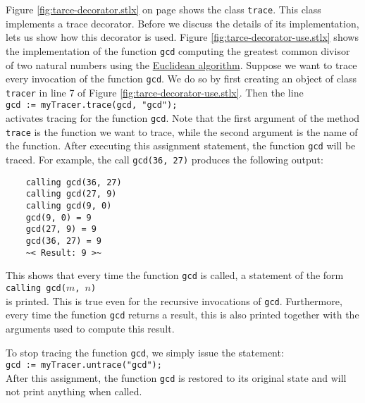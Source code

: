 Figure \ref{fig:tarce-decorator.stlx} on page \pageref{fig:tarce-decorator.stlx} shows the class
\texttt{trace}.  This class implements a trace decorator.  Before we discuss the details of its
implementation, lets us show how this decorator is used.  Figure \ref{fig:tarce-decorator-use.stlx}
shows the implementation of the function \texttt{gcd} computing the greatest common divisor of two
natural numbers using the \href{http://en.wikipedia.org/wiki/Euclidean_algorithm}{Euclidean algorithm}.
Suppose we want to trace every invocation of the function \texttt{gcd}.  We do so by first creating
an object of class \texttt{tracer} in line 7 of Figure \ref{fig:tarce-decorator-use.stlx}.  Then the line
\\[0.2cm]
\hspace*{1.3cm}
\texttt{gcd := myTracer.trace(gcd, "gcd");}
\\[0.2cm]
activates tracing for the function \texttt{gcd}.  Note that the first argument of the method
\texttt{trace} is the function we want to trace, while the second argument is the name of the function.
After executing this assignment statement, the function \texttt{gcd} will be traced.
For example, the call \texttt{gcd(36, 27)} produces the following output:
\begin{verbatim}
    calling gcd(36, 27)
    calling gcd(27, 9)
    calling gcd(9, 0)
    gcd(9, 0) = 9
    gcd(27, 9) = 9
    gcd(36, 27) = 9
    ~< Result: 9 >~
\end{verbatim}
This shows that every time the function \texttt{gcd} is called, a statement of the form
\\[0.2cm]
\hspace*{1.3cm}
\texttt{calling gcd($m$, $n$)}
\\[0.2cm]
is printed.  This is true even for the recursive invocations of \texttt{gcd}.  Furthermore,
every time the function \texttt{gcd} returns a result, this is also printed together with the
arguments used to compute this result.

To stop tracing the function \texttt{gcd}, we simply issue the statement:
\\[0.2cm]
\hspace*{1.3cm}
\texttt{gcd := myTracer.untrace("gcd");}
\\[0.2cm]
After this assignment, the function \texttt{gcd} is restored to its original state and will not print
anything when called.

